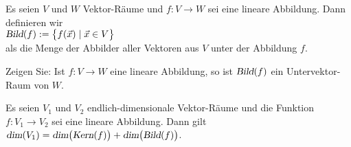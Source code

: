 \begin{Definition}[Bild]
Es seien $V$ und $W$ Vektor-R\"{a}ume und $f:V \rightarrow W$ sei eine lineare Abbildung.  Dann 
definieren wir
\\[0.2cm]
\hspace*{1.3cm}
$\textsl{Bild}(f) := \bigl\{ f(\vec{x}) \mid \vec{x} \in V \bigr\}$
\\[0.2cm]
als die Menge der Abbilder aller Vektoren aus $V$ unter der Abbildung $f$.
\eoxs
\end{Definition}

\exercise
Zeigen Sie: Ist $f: V \rightarrow W$ eine lineare Abbildung, so ist $\textsl{Bild}(f)$ ein Untervektor-Raum von $W$.
\eoxs

\begin{Satz}
  Es seien $V_1$ und $V_2$ endlich-dimensionale Vektor-R\"{a}ume und die Funktion $f: V_1 \rightarrow V_2$ sei eine lineare Abbildung.
  Dann gilt
  \\[0.2cm]
  \hspace*{1.3cm}
  $\textsl{dim}(V_1) = \textsl{dim}\bigl(\textsl{Kern}(f)\bigr) + \textsl{dim}\bigl(\textsl{Bild}(f)\bigr)$.
\end{Satz}

